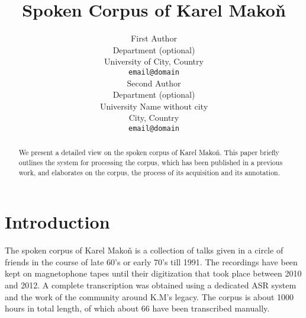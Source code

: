 \documentclass[a4paper,11pt]{article}
\title{Spoken Corpus of Karel Mako\v{n}}
\author{First Author \\
  Department (optional)\\
  University of City, Country \\
  {\tt email@domain} \\\And %
  Second Author \\
  Department (optional)\\
  University Name without city \\
  City, Country \\
 {\tt email@domain} \\
}
\date{}
\begin{document}
\maketitle
\begin{abstract}
  We present a detailed view on the spoken corpus of Karel Mako\v{n}. This paper
  briefly outlines the system for processing the corpus, which has been
  published in a previous work, and elaborates on the corpus, the process of its
  acquisition and its annotation.
\end{abstract}

\section{Introduction} \label{intro}

%

The spoken corpus of Karel Mako\v{n} is a collection of talks given in a circle
of friends in the course of late 60's or early 70's till 1991. The recordings
have been kept on magnetophone tapes until their digitization that took place
between 2010 and 2012. A complete transcription was obtained using a dedicated
ASR system and the work of the community around K.M's legacy. The corpus is
about 1000 hours in total length, of which about 66 have been transcribed
manually.
\end{document}
